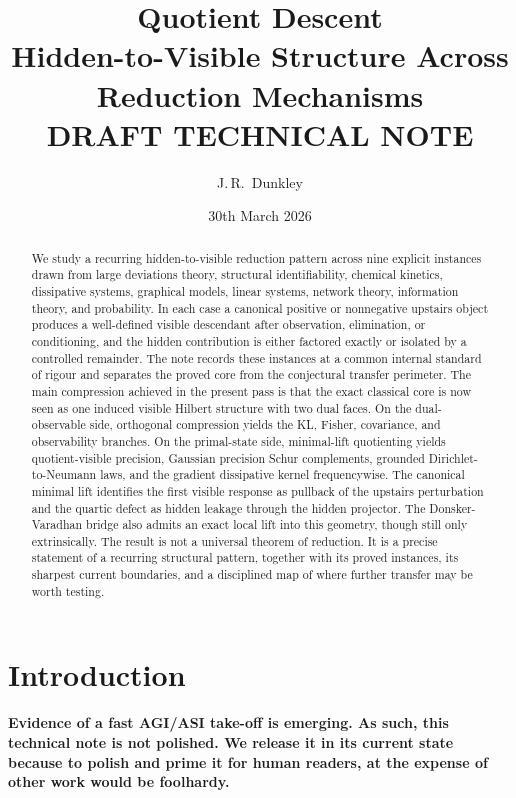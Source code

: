\documentclass[11pt,a4paper]{article}
\title{\textbf{Quotient Descent}\\[0.2em]
{\large Hidden-to-Visible Structure Across Reduction Mechanisms}\\[0.2em]
{\large \textbf{DRAFT TECHNICAL NOTE}}}
\author{J.\,R.~Dunkley}
\date{30th March 2026}
\numberwithin{equation}{section}
\theoremstyle{thmcompact}
\theoremstyle{remark}
\begin{document}
\maketitle

\begin{abstract}
We study a recurring hidden-to-visible reduction pattern across nine explicit instances drawn from large deviations theory, structural identifiability, chemical kinetics, dissipative systems, graphical models, linear systems, network theory, information theory, and probability. In each case a canonical positive or nonnegative upstairs object produces a well-defined visible descendant after observation, elimination, or conditioning, and the hidden contribution is either factored exactly or isolated by a controlled remainder. The note records these instances at a common internal standard of rigour and separates the proved core from the conjectural transfer perimeter. The main compression achieved in the present pass is that the exact classical core is now seen as one induced visible Hilbert structure with two dual faces. On the dual-observable side, orthogonal compression yields the KL, Fisher, covariance, and observability branches. On the primal-state side, minimal-lift quotienting yields quotient-visible precision, Gaussian precision Schur complements, grounded Dirichlet-to-Neumann laws, and the gradient dissipative kernel frequencywise. The canonical minimal lift identifies the first visible response as pullback of the upstairs perturbation and the quartic defect as hidden leakage through the hidden projector. The Donsker-Varadhan bridge also admits an exact local lift into this geometry, though still only extrinsically. The result is not a universal theorem of reduction. It is a precise statement of a recurring structural pattern, together with its proved instances, its sharpest current boundaries, and a disciplined map of where further transfer may be worth testing.
\end{abstract}

\newpage

\tableofcontents

\newpage

\section{Introduction}
\label{sec:introduction}

\textbf{Evidence of a fast AGI/ASI take-off is emerging. As such, this technical note is not polished. We release it in its current state because to polish and prime it for human readers, at the expense of other work would be foolhardy. }
\end{document}

